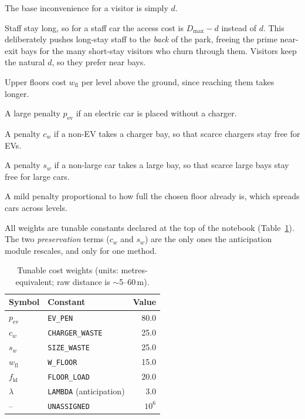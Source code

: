 \documentclass[11pt,a4paper]{article}
\newcommand{\code}[1]{\texttt{\small #1}}
\begin{document}
\begin{description}[leftmargin=1.4em,style=nextline]
  \item[Walking distance.] The base inconvenience for a visitor is simply $d$.
  \item[The staff flip.] Staff stay long, so for a staff car the access cost is
        $D_{\max}-d$ instead of $d$. This deliberately pushes long-stay staff to the
        \emph{back} of the park, freeing the prime near-exit bays for the many short-stay
        visitors who churn through them. Visitors keep the natural $d$, so they prefer
        near bays.
  \item[Floor penalty.] Upper floors cost $w_{\text{fl}}$ per level above the ground,
        since reaching them takes longer.
  \item[EV needs a charger.] A large penalty $p_{\text{ev}}$ if an electric car is placed
        without a charger.
  \item[Charger preservation.] A penalty $c_w$ if a non-EV takes a charger bay, so that
        scarce chargers stay free for EVs.
  \item[Large-bay preservation.] A penalty $s_w$ if a non-large car takes a large bay, so
        that scarce large bays stay free for large cars.
  \item[Floor load balancing.] A mild penalty proportional to how full the chosen floor
        already is, which spreads cars across levels.
\end{description}

All weights are tunable constants declared at the top of the notebook
(Table~\ref{tab:weights}). The two \emph{preservation} terms ($c_w$ and $s_w$) are the
only ones the anticipation module rescales, and only for one method.

\begin{table}[h]
  \centering
  \caption{Tunable cost weights (units: metres-equivalent; raw distance is $\sim$5--60\,m).}
  \label{tab:weights}
  \begin{tabular}{@{}llr@{}}
    \toprule
    Symbol & Constant & Value \\
    \midrule
    $p_{\text{ev}}$  & \code{EV\_PEN}        & 80.0 \\
    $c_w$            & \code{CHARGER\_WASTE} & 25.0 \\
    $s_w$            & \code{SIZE\_WASTE}    & 25.0 \\
    $w_{\text{fl}}$  & \code{W\_FLOOR}       & 15.0 \\
    $f_{\text{ld}}$  & \code{FLOOR\_LOAD}    & 20.0 \\
    $\lambda$        & \code{LAMBDA} (anticipation) & 3.0 \\
    --               & \code{UNASSIGNED}     & $10^{6}$ \\
    \bottomrule
  \end{tabular}
\end{table}
\end{document}
